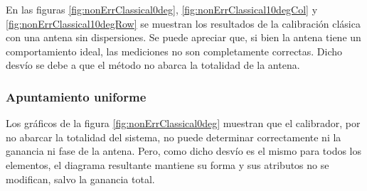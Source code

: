 En las figuras \ref{fig:nonErrClassical0deg}, \ref{fig:nonErrClassical10degCol} y \ref{fig:nonErrClassical10degRow} se muestran
los resultados de la calibración clásica con una antena sin dispersiones. Se puede apreciar que, si bien la antena tiene un 
comportamiento ideal, las mediciones no son completamente correctas. Dicho desvío se debe a que el método no abarca la 
totalidad de la antena.


\subsubsection{Apuntamiento uniforme}

Los gráficos de la figura \ref{fig:nonErrClassical0deg} muestran que el calibrador, por no abarcar la totalidad del sistema, no 
puede determinar correctamente ni la ganancia ni fase de la antena. Pero, como dicho desvío es el mismo para todos los elementos,
el diagrama resultante mantiene su forma y sus atributos no se modifican, salvo la ganancia total.

